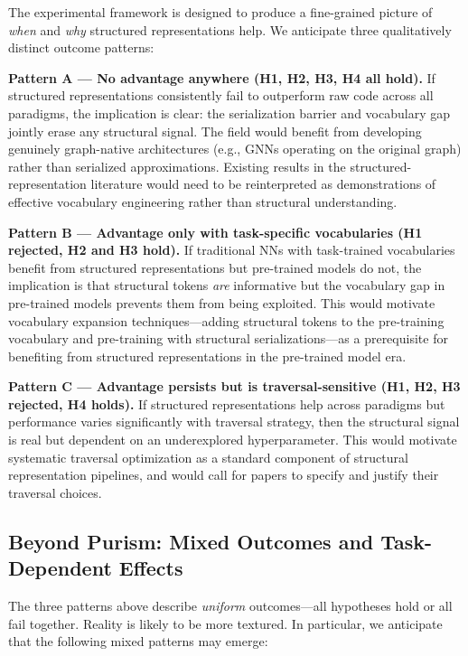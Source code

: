\documentclass[pdflatex,sn-mathphys,Numbered]{sn-jnl}
\begin{document}
The experimental framework is designed to produce a fine-grained picture of \emph{when} and \emph{why} structured representations help. We anticipate three qualitatively distinct outcome patterns:

\textbf{Pattern A --- No advantage anywhere (H1, H2, H3, H4 all hold).} If structured representations consistently fail to outperform raw code across all paradigms, the implication is clear: the serialization barrier and vocabulary gap jointly erase any structural signal. The field would benefit from developing genuinely graph-native architectures (e.g., GNNs operating on the original graph) rather than serialized approximations. Existing results in the structured-representation literature would need to be reinterpreted as demonstrations of effective vocabulary engineering rather than structural understanding.

\textbf{Pattern B --- Advantage only with task-specific vocabularies (H1 rejected, H2 and H3 hold).} If traditional NNs with task-trained vocabularies benefit from structured representations but pre-trained models do not, the implication is that structural tokens \emph{are} informative but the vocabulary gap in pre-trained models prevents them from being exploited. This would motivate vocabulary expansion techniques---adding structural tokens to the pre-training vocabulary and pre-training with structural serializations---as a prerequisite for benefiting from structured representations in the pre-trained model era.

\textbf{Pattern C --- Advantage persists but is traversal-sensitive (H1, H2, H3 rejected, H4 holds).} If structured representations help across paradigms but performance varies significantly with traversal strategy, then the structural signal is real but dependent on an underexplored hyperparameter. This would motivate systematic traversal optimization as a standard component of structural representation pipelines, and would call for papers to specify and justify their traversal choices.

\subsection{Beyond Purism: Mixed Outcomes and Task-Dependent Effects}

The three patterns above describe \emph{uniform} outcomes---all hypotheses hold or all fail together. Reality is likely to be more textured. In particular, we anticipate that the following mixed patterns may emerge:
\end{document}

